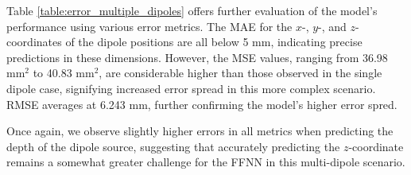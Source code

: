 \documentclass[a4paper, UKenglish, 11pt]{uiomaster}
\begin{document}
Table \ref{table:error_multiple_dipoles} offers further evaluation of the model's performance using various error metrics. The MAE for the $x$-, $y$-, and $z$-coordinates of the dipole positions are all below 5 mm, indicating precise predictions in these dimensions. However, the MSE values, ranging from 36.98 mm$^2$ to 40.83 mm$^2$, are considerable higher than those observed in the single dipole case, signifying increased error spread in this more complex scenario. RMSE averages at 6.243 mm, further confirming the model's higher error spred.

Once again, we observe slightly higher errors in all metrics when predicting the depth of the dipole source, suggesting that accurately predicting the $z$-coordinate remains a somewhat greater challenge for the FFNN in this multi-dipole scenario.
\end{document}
